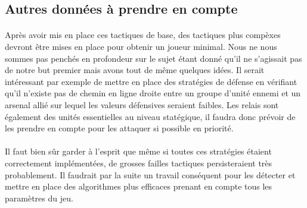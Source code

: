 		\subsection{Autres données à prendre en compte}
		
		\paragraph{}
		Après avoir mis en place ces tactiques de base, des tactiques plus compèxes devront être mises en place pour obtenir un joueur minimal.
		Nous ne nous sommes pas penchés en profondeur sur le sujet étant donné qu'il ne s'agissait pas de notre but premier mais avons tout de même quelques idées.
		Il serait intéressant par exemple de mettre en place des stratégies de défense en vérifiant qu'il n'existe pas de chemin en ligne droite entre un groupe
		d'unité ennemi et un arsenal allié sur lequel les valeurs défensives seraient faibles.
		Les relais sont également des unités essentielles au niveau statégique, il faudra donc prévoir de les prendre en compte pour les attaquer si possible
		en priorité.
		
		\paragraph{}
		Il faut bien sûr garder à l'esprit que même si toutes ces stratégies étaient correctement implémentées, de grosses failles tactiques persisteraient
		très probablement. Il faudrait par la suite un travail conséquent pour les détecter et mettre en place des algorithmes plus efficaces prenant en compte
		tous les paramètres du jeu.
		

	
